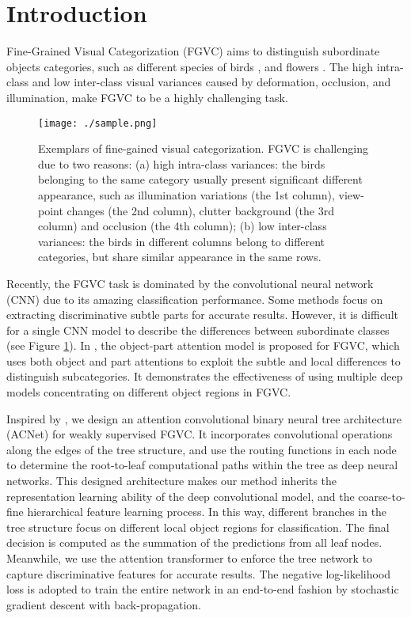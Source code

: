 \documentclass[10pt,twocolumn,letterpaper]{article}
\begin{document}
\section{Introduction}
Fine-Grained Visual Categorization (FGVC) aims to distinguish subordinate objects categories, such as different species of birds \cite{report-wahcub_200_2011,DBLP:conf/iccv/ZhengFML17}, and flowers \cite{DBLP:conf/wacv/AngelovaZL13}. The high intra-class and low inter-class visual variances caused by deformation, occlusion, and illumination, make FGVC to be a highly challenging task.

\begin{figure}[t]
\centering
\texttt{[image: ./sample.png]}
\vspace{-4mm}
\caption{Exemplars of fine-gained visual categorization. FGVC is challenging due to two reasons: (a) high intra-class variances:  the birds belonging to the same category usually present significant different appearance, such as illumination variations (the 1st column), view-point changes (the 2nd column), clutter background (the 3rd column) and occlusion (the 4th column); (b) low inter-class variances: the birds in different columns belong to different categories, but share similar appearance in the same rows.}
\label{fig:intro}
\end{figure}

Recently, the FGVC task is dominated by the convolutional neural network (CNN) due to its amazing classification performance. Some methods \cite{DBLP:conf/iccv/LinRM15,DBLP:journals/corr/abs-1810-06058} focus on extracting discriminative subtle parts for accurate results. However, it is difficult for a single CNN model to describe the differences between subordinate classes (see Figure \ref{fig:intro}). In \cite{DBLP:journals/corr/PengHZ17}, the object-part attention model is proposed for FGVC, which uses both object and part attentions to exploit the subtle and local differences to distinguish subcategories. It demonstrates the effectiveness of using multiple deep models concentrating on different object regions in FGVC.

Inspired by \cite{DBLP:conf/icml/TannoAACN19}, we design an attention convolutional binary neural tree architecture (ACNet) for weakly supervised FGVC. It incorporates convolutional operations along the edges of the tree structure, and use the routing functions in each node to determine the root-to-leaf computational paths within the tree as deep neural networks. This designed architecture makes our method inherits the representation learning ability of the deep convolutional model, and the coarse-to-fine hierarchical feature learning process. In this way, different branches in the tree structure focus on different local object regions for classification. The final decision is computed as the summation of the predictions from all leaf nodes. Meanwhile, we use the attention transformer to enforce the tree network to capture discriminative features for accurate results. The negative log-likelihood loss is adopted to train the entire network in an end-to-end fashion by stochastic gradient descent with back-propagation.
\end{document}
